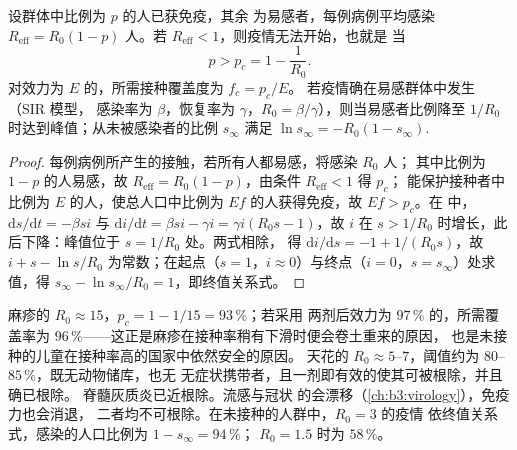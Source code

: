 \begin{theorem}[群体免疫阈值]\label{thm:b3:adaptive-immunity:herd}
设群体中比例为 $p$ 的人已获免疫，其余
为易感者，每例病例平均感染 $R_{\text{eff}} = R_{0}(1 -
p)$ 人。若 $R_{\text{eff}} < 1$，则疫情无法开始，也就是
当
\[
p > p_{c} = 1 - \frac{1}{R_{0}} .
\]
对效力为 $E$ 的，所需接种覆盖度为 $f_{c} = p_{c}/E$。
若疫情确在易感群体中发生（SIR 模型，
感染率为 $\beta$，恢复率为 $\gamma$，$R_{0} =
\beta/\gamma$），则当易感者比例降至
$1/R_{0}$ 时达到峰值；从未被感染者的比例 $s_{\infty}$ 满足
$\ln s_{\infty} = -R_{0}(1 - s_{\infty})$.
\end{theorem}
\begin{proof}
每例病例所产生的接触，若所有人都易感，将感染 $R_{0}$ 人；
其中比例为 $1 - p$ 的人易感，故 $R_{\text{eff}} =
R_{0}(1-p)$，由条件 $R_{\text{eff}} < 1$ 得 $p_{c}$；
能保护接种者中比例为 $E$ 的人，使总人口中比例为
$Ef$ 的人获得免疫，故 $Ef > p_{c}$。在 中，$\mathrm{d}s/\mathrm{d}t = -\beta si$ 与 $\mathrm{d}i/\mathrm{d}t =
\beta si - \gamma i = \gamma i(R_{0}s - 1)$，故 $i$ 在 $s >
1/R_{0}$ 时增长，此后下降：峰值位于 $s = 1/R_{0}$ 处。两式相除，
得 $\mathrm{d}i/\mathrm{d}s = -1 + 1/(R_{0}s)$，故 $i + s -
\ln s/R_{0}$ 为常数；在起点（$s = 1$，$i
\approx 0$）与终点（$i = 0$，$s = s_{\infty}$）处求值，得
$s_{\infty} - \ln s_{\infty}/R_{0} = 1$，即终值关系式。
\end{proof}

\begin{example}[麻疹与天花]\label{ex:b3:adaptive-immunity:measles}
麻疹的 $R_{0} \approx 15$，$p_{c} = 1 - 1/15 = 93\,\%$；若采用
两剂后效力为 $97\,\%$ 的，所需覆盖率为
$96\,\%$——这正是麻疹在接种率稍有下滑时便会卷土重来的原因，
也是未接种的儿童在接种率高的国家中依然安全的原因。
天花的 $R_{0} \approx 5$--$7$，阈值约为
$80$--$85\,\%$，既无动物储库，也无
无症状携带者，且一剂即有效的使其可被根除，并且确已根除。
脊髓灰质炎已近根除。流感与冠状
的会漂移（\cref{ch:b3:virology}），免疫力也会消退，
二者均不可根除。在未接种的人群中，$R_{0} = 3$ 的疫情
依终值关系式，感染的人口比例为 $1 - s_{\infty} = 94\,\%$；
$R_{0} = 1.5$ 时为 $58\,\%$。
\end{example}

